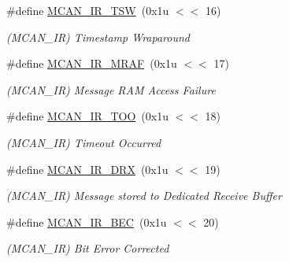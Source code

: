 \begin{DoxyCompactItemize}
\mbox{\label{group__SAMV71__MCAN_gac0744661a9c2ed44e6d9f4231c71eaa4}} 
\#define \mbox{\hyperlink{group__SAMV71__MCAN_gac0744661a9c2ed44e6d9f4231c71eaa4}{M\+C\+A\+N\+\_\+\+I\+R\+\_\+\+T\+SW}}~(0x1u $<$$<$ 16)
\begin{DoxyCompactList}\small\item\em (M\+C\+A\+N\+\_\+\+IR) Timestamp Wraparound \end{DoxyCompactList}\item 
\mbox{\label{group__SAMV71__MCAN_ga09ad2d1b505ca0f945593b3b747fb4ca}} 
\#define \mbox{\hyperlink{group__SAMV71__MCAN_ga09ad2d1b505ca0f945593b3b747fb4ca}{M\+C\+A\+N\+\_\+\+I\+R\+\_\+\+M\+R\+AF}}~(0x1u $<$$<$ 17)
\begin{DoxyCompactList}\small\item\em (M\+C\+A\+N\+\_\+\+IR) Message R\+AM Access Failure \end{DoxyCompactList}\item 
\mbox{\label{group__SAMV71__MCAN_ga8434950d8f1f0866e9ebf77a92583f85}} 
\#define \mbox{\hyperlink{group__SAMV71__MCAN_ga8434950d8f1f0866e9ebf77a92583f85}{M\+C\+A\+N\+\_\+\+I\+R\+\_\+\+T\+OO}}~(0x1u $<$$<$ 18)
\begin{DoxyCompactList}\small\item\em (M\+C\+A\+N\+\_\+\+IR) Timeout Occurred \end{DoxyCompactList}\item 
\mbox{\label{group__SAMV71__MCAN_gac1e07bcc65783e6dc34dbf4d3f6134ce}} 
\#define \mbox{\hyperlink{group__SAMV71__MCAN_gac1e07bcc65783e6dc34dbf4d3f6134ce}{M\+C\+A\+N\+\_\+\+I\+R\+\_\+\+D\+RX}}~(0x1u $<$$<$ 19)
\begin{DoxyCompactList}\small\item\em (M\+C\+A\+N\+\_\+\+IR) Message stored to Dedicated Receive Buffer \end{DoxyCompactList}\item 
\mbox{\label{group__SAMV71__MCAN_gab61bc39edb085ec7df1088a87c836dec}} 
\#define \mbox{\hyperlink{group__SAMV71__MCAN_gab61bc39edb085ec7df1088a87c836dec}{M\+C\+A\+N\+\_\+\+I\+R\+\_\+\+B\+EC}}~(0x1u $<$$<$ 20)
\begin{DoxyCompactList}\small\item\em (M\+C\+A\+N\+\_\+\+IR) Bit Error Corrected \end{DoxyCompactList}\item 
$$
\end{DoxyCompactItemize}
